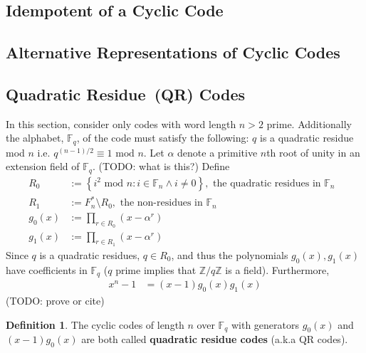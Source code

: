 \documentclass{article}
\renewcommand{\tt}[1]{\text{ #1 }}
\newcommand{\Z}{\mathbb{Z}}
\newcommand{\F}{\mathbb{F}}
\renewcommand{\mod}{\text{ mod }}
\renewcommand{\=}{\equiv}
\newcommand{\set}[1]{\left\{ #1 \right\}}
\theoremstyle{plain}
\theoremstyle{definition}
\newtheorem{defn}{Definition}[subsection]
\newcommand{\TODO}[1]{(TODO: #1)}
\begin{document}
\subsection{Idempotent of a Cyclic Code}

\subsection{Alternative Representations of Cyclic Codes}

\subsection{Quadratic Residue (QR) Codes}

In this section, consider only codes with word length $n > 2$ prime.
Additionally the alphabet, $\F_q$, of the code must satisfy the following: $q$ is a quadratic residue mod $n$ i.e. $q^{(n-1)/2} \= 1 \mod n$.
Let $\alpha$ denote a primitive $n$th root of unity in an extension field of $\F_q$. \TODO{what is this?}
Define
\begin{align}
  R_0 &:= \set{ i^2 \mod n : i \in \F_n \land i \neq 0 }, \tt{the quadratic residues in $\F_n$} \\
  R_1 &:= F_n^* \setminus R_0, \tt{the non-residues in $\F_n$} \\
  g_0(x) &:= \prod_{r \in R_0} (x - \alpha^r) \\
  g_1(x) &:= \prod_{r \in R_1} (x - \alpha^r)
\end{align}
Since $q$ is a quadratic residues, $q \in R_0$, and thus the polynomials $g_0(x), g_1(x)$ have coefficients in $\F_q$ ($q$ prime implies that $\Z/q\Z$ is a field).
Furthermore,
\begin{align}
  x^n - 1 &= (x-1) g_0(x) g_1(x)
\end{align}
\TODO{prove or cite}

\begin{defn}
  \label{def:qr-code}
  The cyclic codes of length $n$ over $\F_q$ with generators $g_0(x)$ and $(x-1)g_0(x)$ are both called \textbf{quadratic residue codes} (a.k.a QR codes).
\end{defn}
\end{document}
